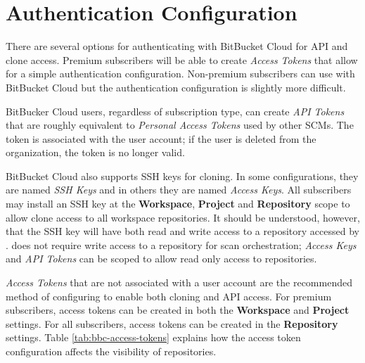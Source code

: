 \section{Authentication Configuration}

There are several options for authenticating with BitBucket Cloud for API and clone
access.  Premium subscribers will be able to create \textit{Access Tokens} that
allow for a simple authentication configuration.  Non-premium subscribers can use
\cxoneflow with BitBucket Cloud but the authentication configuration is slightly
more difficult.

BitBucker Cloud users, regardless of subscription type, can create \textit{API Tokens} that
are roughly equivalent to \textit{Personal Access Tokens} used by other SCMs.  The token
is associated with the user account; if the user is deleted from the organization, the token
is no longer valid.

BitBucket Cloud also supports SSH keys for cloning.  In some configurations, they are
named \textit{SSH Keys} and in others they are named \textit{Access Keys}.  All subscribers
may install an SSH key at the \textbf{Workspace}, \textbf{Project} and
\textbf{Repository} scope to allow clone access to all workspace repositories.
It should be understood, however, that the SSH key will have both read and write access
to a repository accessed by \cxoneflowns.  \cxoneflow does not require write access to a
repository for scan orchestration; \textit{Access Keys} and \textit{API Tokens} can be scoped
to allow read only access to repositories.

\textit{Access Tokens} that are not associated with a user account are the recommended
method of configuring \cxoneflow to enable both cloning and API access.  For premium
subscribers, access tokens can be created in both the \textbf{Workspace} and \textbf{Project}
settings.  For all subscribers, access tokens can be created in the \textbf{Repository} settings.
Table \ref{tab:bbc-access-tokens} explains how the access token configuration affects
the visibility of repositories.



